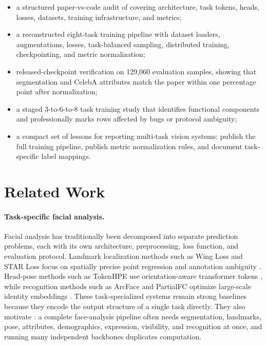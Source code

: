 \begin{itemize}
\item a structured paper-vs-code audit of \method covering architecture, task tokens, heads, losses, datasets, training infrastructure, and metrics;
\item a reconstructed eight-task training pipeline with dataset loaders, augmentations, losses, task-balanced sampling, distributed training, checkpointing, and metric normalization;
\item released-checkpoint verification on 129,060 evaluation samples, showing that segmentation and CelebA attributes match the paper within one percentage point after normalization;
\item a staged 3-to-6-to-8 task training study that identifies functional components and professionally marks rows affected by bugs or protocol ambiguity;
\item a compact set of lessons for reporting multi-task vision systems: publish the full training pipeline, publish metric normalization rules, and document task-specific label mappings.
\end{itemize}

\section{Related Work}

\paragraph{Task-specific facial analysis.}
Facial analysis has traditionally been decomposed into separate prediction problems, each with its own architecture, preprocessing, loss function, and evaluation protocol. Landmark localization methods such as Wing Loss and STAR Loss focus on spatially precise point regression and annotation ambiguity \citep{wing2018,star2023}. Head-pose methods such as TokenHPE use orientation-aware transformer tokens \citep{tokenhpe2023}, while recognition methods such as ArcFace and PartialFC optimize large-scale identity embeddings \citep{arcface2019,partialfc2021}. These task-specialized systems remain strong baselines because they encode the output structure of a single task directly. They also motivate \method: a complete face-analysis pipeline often needs segmentation, landmarks, pose, attributes, demographics, expression, visibility, and recognition at once, and running many independent backbones duplicates computation.

